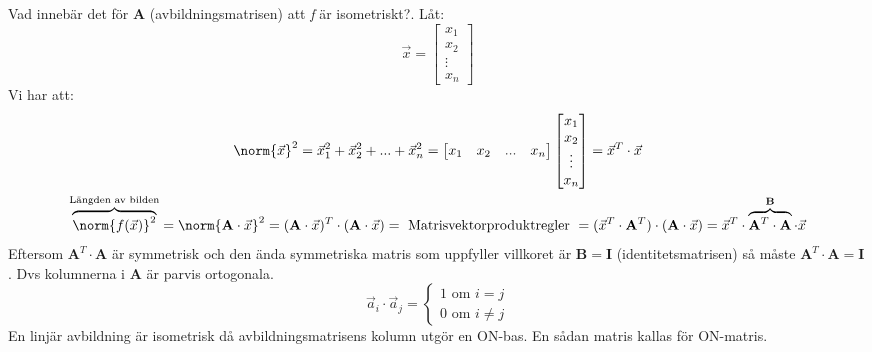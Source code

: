 Vad innebär det för \textbf{A} (avbildningsmatrisen) att \textit{f} är isometriskt?. Låt:
\[
\vec{x} = \begin{bmatrix} x_1\\x_2\\\vdots\\x_n \end{bmatrix}
\]
Vi har att:
\begin{gather*}
	\norm{\vec{x}}^2 = \vec{x}_1^2 + \vec{x}_2^2 + ... + \vec{x}_n^2 = \begin{bmatrix} x_1 & x_2 & ... & x_n \end{bmatrix} \begin{bmatrix} x_1\\x_2\\\vdots\\x_n \end{bmatrix} = \vec{x}^T \cdot \vec{x}\\
	\overbrace{\norm{f(\vec{x})}^2}^\text{Längden av bilden} = \norm{\mathbf{A} \cdot \vec{x}}^2 = (\mathbf{A} \cdot \vec{x})^T \cdot (\mathbf{A} \cdot \vec{x}) = \text{ Matrisvektorproduktregler }
	= (\vec{x}^T \cdot \mathbf{A}^T) \cdot (\mathbf{A} \cdot \vec{x}) = \vec{x}^T \cdot \overbrace{\mathbf{A}^T \cdot \mathbf{A}}^\mathbf{B} \cdot \vec{x}
\end{gather*}
Eftersom $\mathbf{A}^T \cdot \mathbf{A}$ är symmetrisk och den ända symmetriska matris som uppfyller villkoret är $\mathbf{B} = \mathbf{I}$ (identitetsmatrisen) så måste $\mathbf{A}^T \cdot \mathbf{A} = \mathbf{I}$. Dvs kolumnerna i \textbf{A} är parvis ortogonala.
\[
\vec{a}_i \cdot \vec{a}_j = 
\begin{cases}
	1 \text{ om } i = j\\
	0 \text{ om } i \neq j
\end{cases}
\]
En linjär avbildning är isometrisk då avbildningsmatrisens kolumn utgör en ON-bas. En sådan matris kallas för ON-matris.
